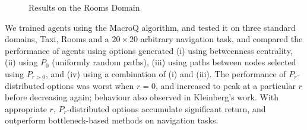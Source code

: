 \label{sec:experiments}

\begin{figure}[h]
\centering
{}
\label{fig:rooms}
\caption{Results on the Rooms Domain}
\end{figure}

We trained agents using the MacroQ algorithm, and tested it on three
standard domains, Taxi, Rooms and a $20\times20$ arbitrary navigation
task, and compared the performance of agents using options generated
(i) using betweenness centrality, (ii) using $P_0$ (uniformly random
paths), (iii) using paths between nodes selected using $P_{r>0}$, and
(iv) using a combination of (i) and (iii).  The performance of
$P_r$-distributed options was worst when $r=0$, and increased to peak
at a particular $r$ before decreasing again; behaviour also observed
in Kleinberg's work. With appropriate $r$, $P_r$-distributed options
accumulate significant return, and outperform bottleneck-based methods
on navigation tasks. 


